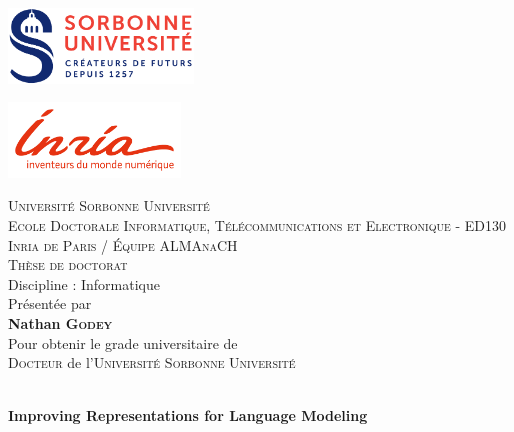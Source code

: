 
\begin{titlepage}

	\begin{center}
		\begin{minipage}[t]{0.4\textwidth}
			\includegraphics[height=2cm]{static/media/sorbonne}
		\end{minipage}%
		\hfill
		\begin{minipage}[t]{0.4\textwidth}
			\hfill
			\includegraphics[height=2cm]{static/media/inria}
		\end{minipage}

		\vspace{0.2cm}
		\LARGE \textsc{Université Sorbonne Université}\\
		\vspace{0.2cm}
		\normalsize \textsc{Ecole Doctorale Informatique, Télécommunications et Electronique} - ED130\\
		\vspace{0.2cm}
		\textsc{Inria de Paris / Équipe ALMAnaCH}\\

		\vspace{0.4cm}
		\Large \textsc{Thèse de doctorat}\\
		\normalsize Discipline : Informatique\\
		\vspace{0.4cm}
		\normalsize Présentée par \\
		\LARGE \textbf{Nathan \textsc{Godey}}\\
		\vspace{0.4cm}
		\normalsize Pour obtenir le grade universitaire de\\
		\Large \textsc{Docteur} de l'\textsc{Université Sorbonne Université}

		\hrulefill\\[0.2cm]

		{\Large  \textbf{Improving Representations for Language Modeling		}}\\[0.1cm]


\end{center}
\end{titlepage}

